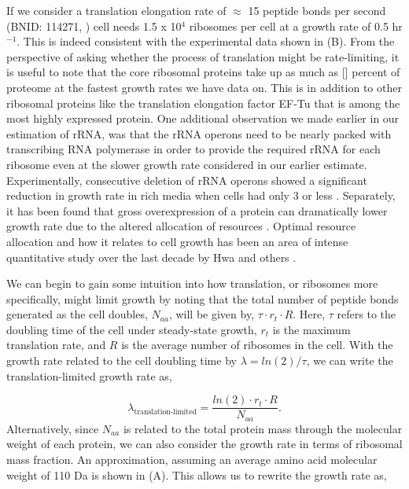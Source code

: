 If we consider a translation elongation rate of $\approx$ 15 peptide bonds per
second (BNID: 114271, \cite{milo2010, dai2016}) cell needs 1.5 x 10$^4$
ribosomes per cell at a growth rate of 0.5 hr$^{-1}$. This is indeed consistent
with the experimental data shown in (B). From the
perspective of asking whether the process of translation might be rate-limiting,
it is useful to note that the core ribosomal proteins take up as much as []
percent of proteome at the fastest growth rates we have data on. This is in
addition to other ribosomal proteins like the translation elongation factor
EF-Tu that is among the most highly expressed protein. One additional
observation we made earlier in our estimation of rRNA, was that the rRNA operons
need to be nearly packed with transcribing RNA polymerase in order to provide
the required rRNA for each ribosome even at the slower growth rate considered in
our earlier estimate. Experimentally, consecutive deletion of rRNA operons
showed a significant reduction in growth rate in rich media when cells had only
3 or less \citep{levin2017}. Separately, it has been found that gross
overexpression of a protein can dramatically lower growth rate due to the
altered allocation of resources \citep{basan2015}. Optimal resource allocation
and how it relates to cell growth has been an area of intense quantitative study
over the last decade by Hwa and others \citep{scott2010, hui2015}.

We can begin to gain some intuition into how translation, or ribosomes more
specifically, might limit growth by noting that the total number of peptide
bonds generated as the cell doubles, $N_{aa}$, will be given by, $\tau \cdot r_t
\cdot R$. Here, $\tau$ refers to the doubling time of the cell under
steady-state growth, $r_t$ is the maximum translation rate, and $R$ is the
average number of ribosomes in the cell. With the growth rate related to the
cell doubling time by $\lambda = ln(2)/\tau$, we can write the
translation-limited growth rate as,

\begin{equation}
\lambda_{\textrm{translation-limited}} = \frac{ln(2) \cdot r_t \cdot R}{N_{aa}}.
\end{equation}
Alternatively, since $N_{aa}$ is related to the total protein mass through the
molecular weight of each protein, we can also consider the growth rate in terms
of ribosomal mass fraction. An approximation, assuming an average amino acid molecular
weight of 110 Da is shown in (A).
This allows us to rewrite the growth rate as,

